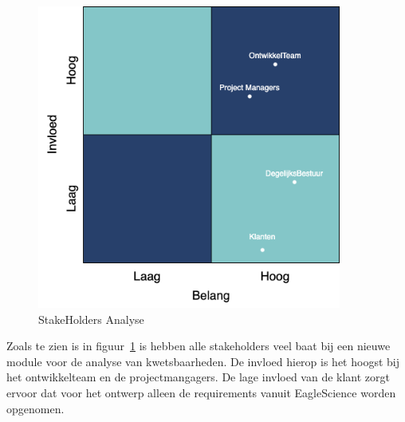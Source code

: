 \begin{figure}[H]
    \myfloatalign
    \includegraphics[width=10cm]{gfx/stakeholderanalyse}
    \caption{StakeHolders Analyse}
    \label{fig:StakeholderAnalyse1}
\end{figure}
Zoals te zien is in figuur~\ref{fig:StakeholderAnalyse1} is hebben alle stakeholders veel baat bij een nieuwe module voor de analyse van kwetsbaarheden. De invloed hierop is het hoogst bij het ontwikkelteam en de projectmangagers. De lage invloed van de klant zorgt ervoor dat voor het ontwerp alleen de requirements vanuit EagleScience worden opgenomen.

